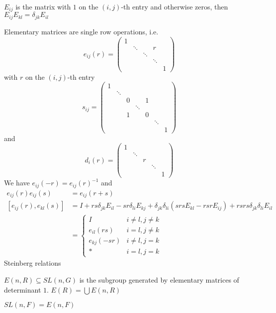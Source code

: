 \documentclass[main]{subfiles}
\begin{document}
\begin{definition}
$E_{ij}$ is the matrix with $1$ on the $(i,j)$-th entry and otherwise zeros, then $E_{ij}E_{kl}=\delta_{jk}E_{il}$ \par
Elementary matrices are single row operations, i.e.
\[e_{ij}(r)=\begin{pmatrix}
1&&&& \\
&\ddots&&r& \\
&&\ddots&& \\
&&&\ddots& \\
&&&&1
\end{pmatrix}\]
with $r$ on the $(i,j)$-th entry
\[s_{ij}=\begin{pmatrix}
1&&&&&& \\
&\ddots&&&&& \\
&&0&&1&& \\
&&&\ddots&&& \\
&&1&&0&& \\
&&&&&\ddots& \\
&&&&&&1
\end{pmatrix}\]
and
\[d_i(r)=\begin{pmatrix}
1&&&& \\
&\ddots&&& \\
&&r&& \\
&&&\ddots& \\
&&&&1
\end{pmatrix}\]
We have $e_{ij}(-r)=e_{ij}(r)^{-1}$ and
\begin{align*}
e_{ij}(r)e_{ij}(s)&=e_{ij}(r+s) \\
[e_{ij}(r),e_{kl}(s)]&=I+rs\delta_{jk}E_{il}-sr\delta_{li}E_{kj}+\delta_{jk}\delta_{li}(srsE_{kl}-rsrE_{ij})+rsrs\delta_{jk}\delta_{li}E_{il} \\
&=\begin{cases}
I&i\neq l,j\neq k \\
e_{il}(rs) &i=l,j\neq k \\
e_{kj}(-sr) &i\neq l,j=k \\
* &i=l,j=k
\end{cases}
\end{align*}
Steinberg relations
\end{definition}

\begin{definition}
$E(n,R)\subseteq SL(n,G)$ is the subgroup generated by elementary matrices of determinant $1$. $E(R)=\bigcup E(n,R)$
\end{definition}

\begin{lemma}
$SL(n,F)=E(n,F)$
\end{lemma}
\end{document}
